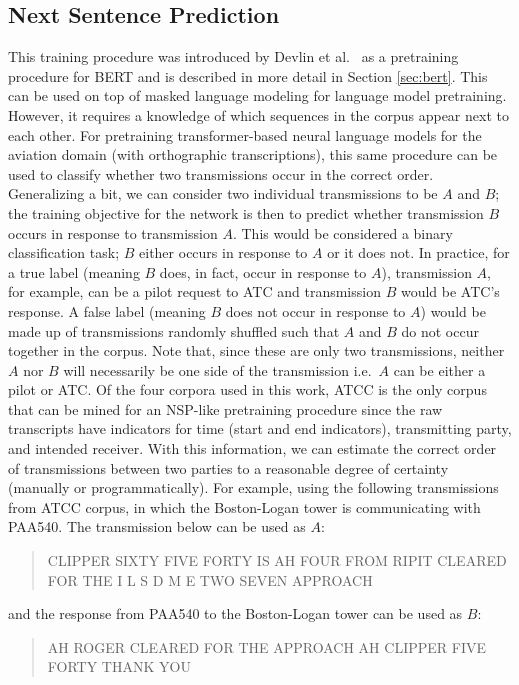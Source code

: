 \documentclass[12pt]{article}
\begin{document}
\subsection{Next Sentence Prediction}
This training procedure was introduced by Devlin et al.~\cite{devlin_bert_2019} as a pretraining procedure for BERT and is described in more detail in
Section \ref{sec:bert}. This can be used on top of masked language modeling for language model pretraining. However, it requires a knowledge of which
sequences in the corpus appear next to each other. For pretraining transformer-based neural language models for the aviation domain (with orthographic
transcriptions), this same procedure can be used to classify whether two transmissions occur in the correct order. Generalizing a bit, we can consider
two individual transmissions to be $A$ and $B$; the training objective for the network is then to predict whether transmission $B$ occurs in response to
transmission $A$. This would be considered a binary classification task; $B$ either occurs in response to $A$ or it does not. In practice, for a true
label (meaning $B$ does, in fact, occur in response to $A$), transmission $A$, for example, can be a pilot request to ATC and transmission $B$ would
be ATC's response. A false label (meaning $B$ does not occur in response to $A$) would be made up of transmissions randomly shuffled such that $A$ and
$B$ do not occur together in the corpus. Note that, since these are only two transmissions, neither $A$ nor $B$ will necessarily be one side of the
transmission i.e.~$A$ can be either a pilot or ATC. Of the four corpora used in this work, ATCC is the only corpus that can be mined for an NSP-like
pretraining procedure since the raw transcripts have indicators for time (start and end indicators), transmitting party, and intended receiver. With
this information, we can estimate the correct order of transmissions between two parties to a reasonable degree of certainty (manually or
programmatically). For example, using the following transmissions from ATCC corpus, in which the Boston-Logan tower is communicating with PAA540. The
transmission below can be used as $A$:

\begin{quote}
    CLIPPER SIXTY FIVE FORTY IS AH FOUR FROM RIPIT CLEARED FOR THE I L S D M E TWO SEVEN APPROACH
\end{quote}

\noindent
and the response from PAA540 to the Boston-Logan tower can be used as $B$:

\begin{quote}
    AH ROGER CLEARED FOR THE APPROACH AH CLIPPER FIVE FORTY THANK YOU
\end{quote}
\end{document}
